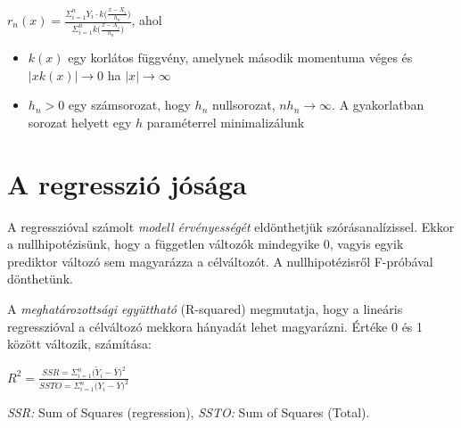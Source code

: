 $r_n(x) = \frac{\Sigma_{i=1}^n Y_i \cdot k\Big(\frac{x-X_i}{h_n}\Big)}{\Sigma_{i=1}^n k\Big(\frac{x-X_i}{h_n}\Big)}$, ahol
\begin{itemize}
\item $k(x)$ egy korlátos függvény, amelynek második momentuma véges és $|xk(x)| \rightarrow 0$ ha $|x| \rightarrow \infty$
\item $h_n>0$ egy számsorozat, hogy $h_n$ nullsorozat, $nh_n \rightarrow \infty$. A gyakorlatban sorozat helyett egy $h$ paraméterrel minimalizálunk
\end{itemize}

\section{A regresszió jósága}

A regresszióval számolt \emph{modell érvényességét} eldönthetjük szórásanalízissel. Ekkor a nullhipotézisünk, hogy a független változók mindegyike 0, vagyis egyik prediktor változó sem magyarázza a célváltozót. A nullhipotézisről F-próbával dönthetünk.

A \emph{meghatározottsági együttható} (R-squared) megmutatja, hogy a lineáris regresszióval a célváltozó mekkora hányadát lehet magyarázni. Értéke 0 és 1 között változik, számítása:

$R^2 = \frac{SSR = \Sigma_{i=1}^n\big(\tilde{Y}_i - \bar{Y}  \big)^2}{SSTO = \Sigma_{i=1}^n\big(Y_i - \bar{Y}  \big)^2}$

\emph{SSR:} Sum of Squares (regression), \emph{SSTO:} Sum of Squares (Total).

